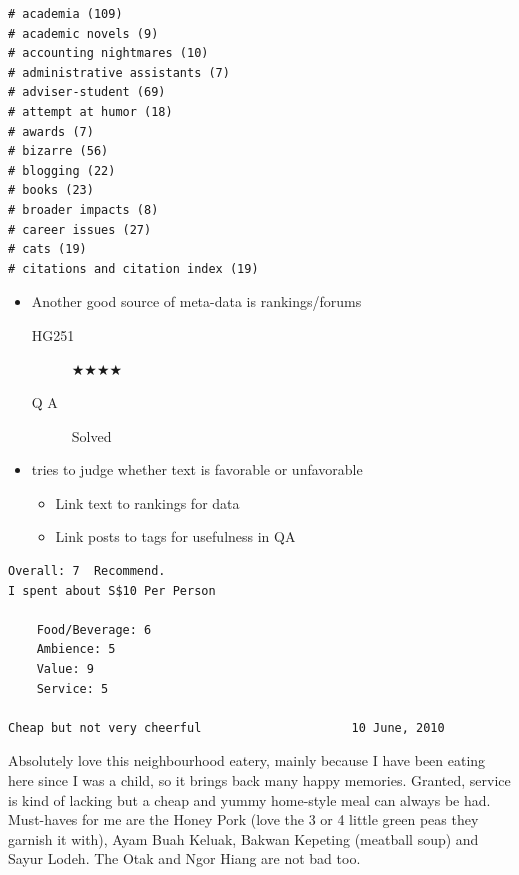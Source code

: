 \documentclass[a4paper,landscape,headrule,footrule,xetex]{foils}
\begin{document}
\begin{verbatim}
# academia (109)
# academic novels (9)
# accounting nightmares (10)
# administrative assistants (7)
# adviser-student (69)
# attempt at humor (18)
# awards (7)
# bizarre (56)
# blogging (22)
# books (23)
# broader impacts (8)
# career issues (27)
# cats (19)
# citations and citation index (19) 
\end{verbatim}


\MyLogo{}

\begin{itemize}
\item Another good source of meta-data is rankings/forums
  \begin{description}
  \item[HG251] ★★★★
  \item[Q A] Solved
  \end{description}
\item {} tries to judge whether text is favorable or unfavorable
  \begin{itemize}
  \item Link text to rankings for data
  \item Link posts to tags for usefulness in QA
  \end{itemize}
\end{itemize}


\begin{verbatim}
Overall: 7  Recommend.
I spent about S$10 Per Person

    Food/Beverage: 6
    Ambience: 5
    Value: 9
    Service: 5

Cheap but not very cheerful                     10 June, 2010 
\end{verbatim}

\begin{small}
  Absolutely love this neighbourhood eatery, mainly because I have
  been eating here since I was a child, so it brings back many happy
  memories. Granted, service is kind of lacking but a cheap and yummy
  home-style meal can always be had. Must-haves for me are the Honey
  Pork (love the 3 or 4 little green peas they garnish it with), Ayam
  Buah Keluak, Bakwan Kepeting (meatball soup) and Sayur Lodeh. The
  Otak and Ngor Hiang are not bad too.
\end{small}
\end{document}
